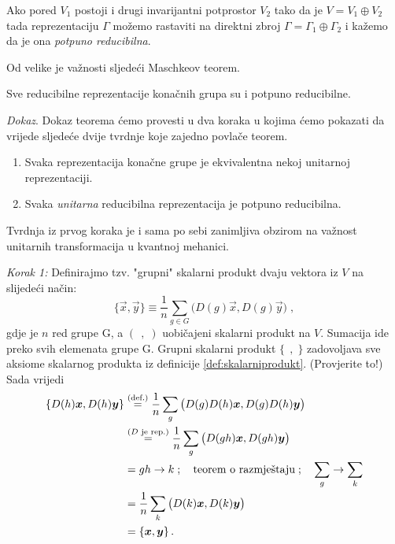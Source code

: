 \begin{definicija}
Ako pored $V_1$ postoji i drugi invarijantni potprostor $V_2$ 
tako da je $V=V_1 \oplus V_2$ tada reprezentaciju $\Gamma$
možemo rastaviti na direktni zbroj $\Gamma=\Gamma_1
\oplus \Gamma_2$ i kažemo da je ona \emph{potpuno reducibilna}.
\end{definicija}

Od velike je važnosti sljedeći Maschkeov teorem.

\begin{teorem}[Maschke]
      
Sve reducibilne reprezentacije konačnih grupa su i potpuno reducibilne.
\end{teorem}

\emph{Dokaz}. Dokaz teorema ćemo provesti u dva koraka u kojima ćemo
pokazati da vrijede sljedeće dvije tvrdnje koje zajedno
povlače teorem.
\begin{enumerate}[noitemsep]
    \item Svaka reprezentacija konačne grupe je ekvivalentna nekoj unitarnoj reprezentaciji.
    \item Svaka \emph{unitarna} reducibilna reprezentacija je potpuno reducibilna.
\end{enumerate}
Tvrdnja iz prvog koraka je i sama po sebi zanimljiva obzirom na važnost unitarnih transformacija
u kvantnoj mehanici. 

\emph{Korak 1:} Definirajmo tzv. "grupni" skalarni produkt dvaju
vektora iz $V$ na slijedeći način:
\begin{equation*}
\{\vec{x}, \vec{y}\} \equiv \frac{1}{n}\sum_{g\in G} \big( D(g)\vec{x},
 D(g)\vec{y}\big) \;, 
\end{equation*}
gdje je $n$ red grupe G, a $(\;\,,\;)$ uobičajeni skalarni produkt na $V$.
Sumacija ide preko svih elemenata grupe G.
Grupni skalarni produkt $\{\;\,,\;\}$ zadovoljava sve aksiome skalarnog
produkta iz definicije \ref{def:skalarniprodukt}. (Provjerite to!)
Sada vrijedi
\begin{equation*}
\begin{split}
\{D(h)\vec{x}, D(h)\vec{y}\} &\stackrel{\text{(def.)}}{=} \frac{1}{n}\sum_g \big( D(g) D(h) \vec{x},
 D(g) D(h) \vec{y} \big) \\
&\stackrel{\text{($D$ je rep.)}}= \frac{1}{n}\sum_g \big( D(gh)\vec{x} , D(gh)\vec{y} \big) \\
&=  gh\to k\;;\quad \text{teorem o razmještaju}\;;\quad \sum_g \to \sum_k \\
\index{Teorem!o razmještaju}
&= \frac{1}{n}\sum_k \big( D(k) \vec{x}, D(k) \vec{y} \big) \\
&= \{\vec{x}, \vec{y}\} \,.
\end{split}
\end{equation*}

